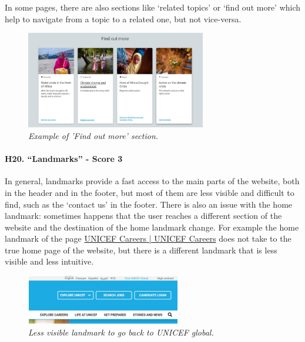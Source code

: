 \newline In some pages, there are also sections like ‘related topics’ or ‘find out more’ which help to navigate from a topic to a related one, but not vice-versa.
\begin{figure}[!h]
	\begin{center}
		\includegraphics[width=0.7\textwidth]{FinalScores22.jpg}
		\captionsetup{font=small}
		\caption{\textit{Example of 'Find out more' section.}}
	\end{center}
\end{figure}
\newline
\newline \paragraph{H20. “Landmarks” - Score 3}	\label{subsec:H20}In general, landmarks provide a fast access to the main parts of the website, both in the header and in the footer, but most of them are less visible and difficult to find, such as the ‘contact us’ in the footer.
\newline There is also an issue with the home landmark: sometimes happens that the user reaches a different section of the website and the destination of the home landmark change. For example the home landmark of the page \href{https://www.unicef.org/careers/}{UNICEF Careers | UNICEF Careers} does not take to the true home page of the website, but there is a different landmark that is less visible and less intuitive.
\begin{figure}[!h]
	\begin{center}
		\includegraphics[width=0.6\textwidth]{FinalScores23.jpg}
		\captionsetup{font=small}
		\caption{\textit{Less visible landmark to go back to UNICEF global.}}
	\end{center}
\end{figure}

